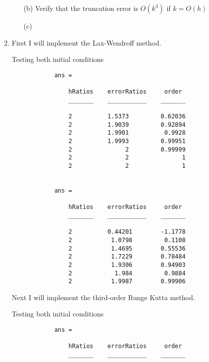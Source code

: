 \documentclass[11pt, oneside, titlepage]{article}
\begin{document}
\begin{enumerate}
\begin{enumerate}
            \item[(b)]
                Verify that the truncation error is $O(k^3)$ if $k = O(h)$

            \item[(c)]

        \end{enumerate}

    \item %
        First I will implement the Lax-Wendroff method.

        
        Testing both initial conditions
        

        \begin{verbatim}
            ans = 

                hRatios    errorRatios     order 
                _______    ___________    _______

                2          1.5373         0.62036
                2          1.9039         0.92894
                2          1.9901          0.9928
                2          1.9993         0.99951
                2               2         0.99999
                2               2               1
                2               2               1


            ans = 

                hRatios    errorRatios     order 
                _______    ___________    _______

                2          0.44201        -1.1778
                2           1.0798         0.1108
                2           1.4695        0.55536
                2           1.7229        0.78484
                2           1.9306        0.94903
                2            1.984         0.9884
                2           1.9987        0.99906
        \end{verbatim}

        Next I will implement the third-order Runge Kutta method.
        
        
        Testing both initial conditions
        

        \begin{verbatim}
            ans = 

                hRatios    errorRatios     order 
                _______    ___________    _______


\end{verbatim}
\end{enumerate}
\end{document}
